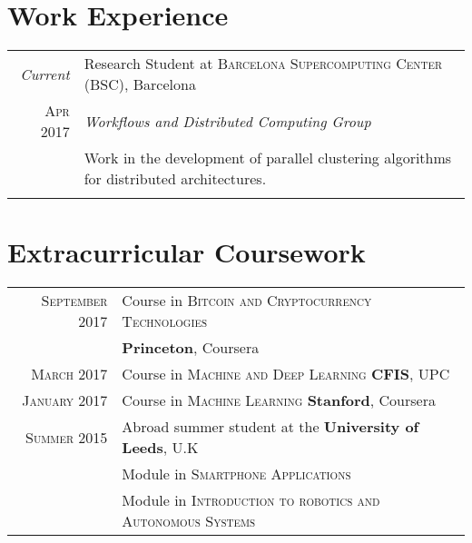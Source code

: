 \documentclass[a4paper,10pt]{article} %
\begin{document}
\vspace{-5pt}

\section{Work Experience}
%
\begin{tabular}{r|p{15cm}}
\emph{Current} & Research Student at \textsc{Barcelona Supercomputing Center (BSC)}, Barcelona \\
\textsc{Apr 2017} & \emph{Workflows and Distributed Computing Group}\\ 
& \footnotesize{Work in the development of parallel clustering algorithms for distributed architectures.}\\
\multicolumn{2}{c}{} \\
\end{tabular}


\section{Extracurricular Coursework}
\begin{tabular}{rl}	
\textsc{September} 2017 &  Course in \textsc{Bitcoin and Cryptocurrency Technologies} \\
 & \textbf{Princeton}, Coursera\\

\textsc{March} 2017 &  Course in \textsc{Machine and Deep Learning} \textbf{CFIS}, UPC\\

\textsc{January} 2017 &  Course in \textsc{Machine Learning} \textbf{Stanford}, Coursera\\


\textsc{Summer} 2015 & Abroad summer student at the \textbf{University of Leeds}, U.K\\
& Module in \textsc{Smartphone Applications}\\ & Module in \textsc{Introduction to robotics and Autonomous Systems}\\
\end{tabular}
\vspace{-5pt}
\end{document}

